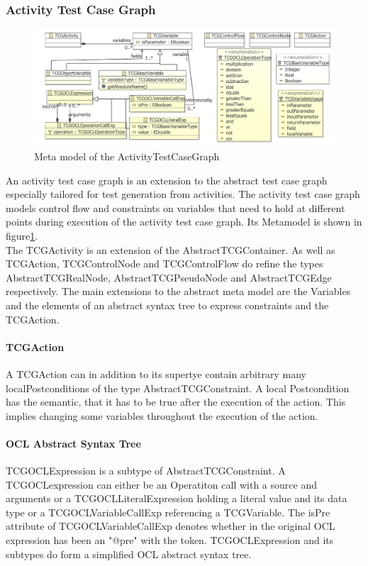 \subsubsection{Activity Test Case Graph}
\begin{figure}
\label{fig:ActivityTCGMetaModel}
\includegraphics[width=\textwidth]{./pics/ActivityTestCaseGraph.pdf}
\caption{Meta model of the ActivityTestCaseGraph}
\end{figure}
An activity test case graph is an extension to the abstract test case graph especially tailored for test generation from activities. The activity test case graph models control flow and constraints on variables that need to hold at different points during execution of the activity test case graph. Its Metamodel is shown in figure\ref{fig:ActivityTCGMetaModel}.\\
The TCGActivity is an extension of the AbstractTCGContainer. As well as TCGAction, TCGControlNode and TCGControlFlow do refine the types AbstractTCGRealNode, AbstractTCGPseudoNode and AbstractTCGEdge respectively. 
The main extensions to the abstract meta model are the Variables and the elements of an abstract syntax tree to express constraints and the TCGAction.
\paragraph{TCGAction} A TCGAction can in addition to its supertye contain arbitrary many localPostconditions of the type AbstractTCGConstraint. A local Postcondition has the semantic, that it has to be true after the execution of the action. This implies changing some variables throughout the execution of the action.
\paragraph{OCL Abstract Syntax Tree}

TCGOCLExpression is a subtype of AbstractTCGConstraint. A TCGOCLexpression can either be an Operatiton call with a source and  arguments or a TCGOCLLiteralExpression holding a literal value and its data type or a TCGOCLVariableCallExp referencing a TCGVariable. The isPre attribute of TCGOCLVariableCallExp denotes whether in the original OCL expression has been an "@pre" with the token. TCGOCLExpression and its subtypes do form a simplified OCL abstract syntax tree.

